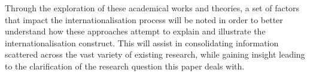 \documentclass[11pt,a4paper]{article}
\begin{document}
 \par 
Through the exploration of these academical works and theories, a set of factors that impact the internationalisation process will be noted in order to better understand how these approaches attempt to explain and illustrate the internationalisation construct. This will assist in consolidating information scattered across the vast variety of existing research, while gaining insight leading to the clarification of the research question this paper deals with. 
\newpage
\end{document}
